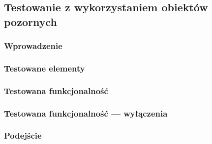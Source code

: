 \subsection{Testowanie z wykorzystaniem obiektów pozornych}

\subsubsection{Wprowadzenie}

\subsubsection{Testowane elementy}

\subsubsection{Testowana funkcjonalność}

\subsubsection{Testowana funkcjonalność --- wyłączenia}

\subsubsection{Podejście}
